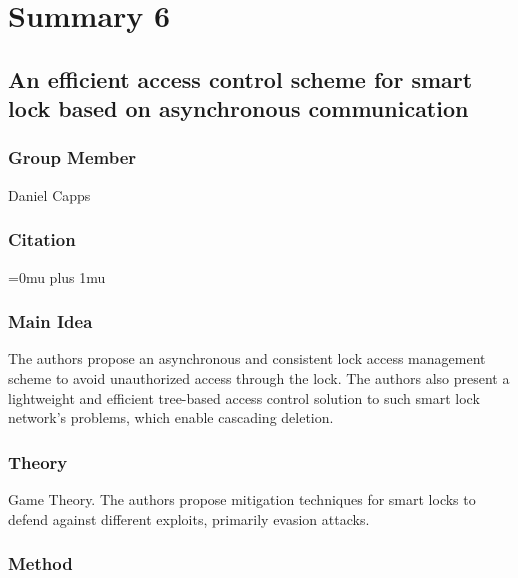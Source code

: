 \section{Summary 6}

\noindent
\subsection{{A}n efficient access control scheme for smart lock based on asynchronous communication}

\subsubsection{Group Member}

\noindent
Daniel Capps

\noindent
\subsubsection{Citation}

\Urlmuskip=0mu plus 1mu\relax


\subsubsection{Main Idea}

\noindent
The authors propose an asynchronous and consistent lock access management scheme to avoid unauthorized access through the lock. The authors also present a lightweight and efficient tree-based access control solution to such smart lock network’s problems, which enable cascading deletion. 

 




\subsubsection{Theory}

\noindent
Game Theory. The authors propose mitigation techniques for smart locks to defend against different exploits, primarily evasion attacks.



\subsubsection{Method}

